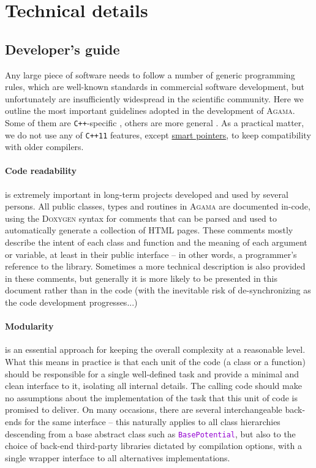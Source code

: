 \documentclass[12pt]{article}
\newcommand{\Agama}{\textsc{Agama}\xspace}
\newcommand{\Cpp}  {\texttt{C++}\xspace}
\newcommand{\CppII}{\texttt{C++11}\xspace}
\newcommand{\ttt}[1]{\textcolor{darkviolet}{\texttt{#1}}}
\let\oldparagraph\paragraph
\renewcommand{\paragraph}[1]{\vspace{-2mm}\oldparagraph{#1}}
\begin{document}
\newpage
\appendix

\section{Technical details}

\subsection{Developer's guide}  \label{sec:DeveloperGuide}

Any large piece of software needs to follow a number of generic programming rules, which are well-known standards in commercial software development, but unfortunately are insufficiently widespread in the scientific community. Here we outline the most important guidelines adopted in the development of \Agama. Some of them are \Cpp-specific \cite{Meyers,SutterAlexandrescu}, others are more general \cite{Martin,McConnell}.
As a practical matter, we do not use any of \CppII features, except \hyperref[sec:SmartPointers]{smart pointers}, to keep compatibility with older compilers.

\paragraph{Code readability} is extremely important in long-term projects developed and used by several persons. All public classes, types and routines in \Agama are documented in-code, using the \textsc{Doxygen} syntax for comments that can be parsed and used to automatically generate a collection of HTML pages. These comments mostly describe the intent of each class and function and the meaning of each argument or variable, at least in their public interface -- in other words, a programmer's reference to the library. Sometimes a more technical description is also provided in these comments, but generally it is more likely to be presented in this document rather than in the code (with the inevitable risk of de-synchronizing as the code development progresses...)

\paragraph{Modularity} is an essential approach for keeping the overall complexity at a reasonable level. What this means in practice is that each unit of the code (a class or a function) should be responsible for a single well-defined task and provide a minimal and clean interface to it, isolating all internal details. The calling code should make no assumptions about the implementation of the task that this unit of code is promised to deliver. On many occasions, there are several interchangeable back-ends for the same interface -- this naturally applies to all class hierarchies descending from a base abstract class such as \ttt{BasePotential}, but also to the choice of back-end third-party libraries dictated by compilation options, with a single wrapper interface to all alternatives implementations.
\end{document}
